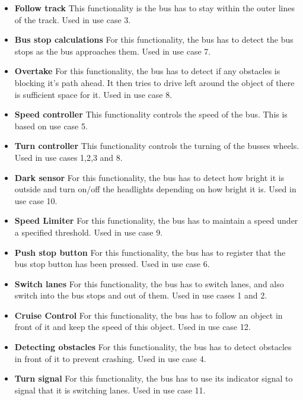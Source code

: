 \begin{itemize}
\item \textbf{Follow track}
This functionality is the bus has to stay within the outer lines of the track. Used in use case 3.
\item \textbf{Bus stop calculations}
For this functionality, the bus has to detect the bus stops as the bus approaches them. Used in use case 7.
\item \textbf{Overtake}
For this functionality, the bus has to detect if any obstacles is blocking it's path ahead. It then tries to drive left around the object of there is sufficient space for it. Used in use case 8.
\item \textbf{Speed controller}
This functionality controls the speed of the bus. This is based on use case 5.
\item \textbf{Turn controller}
This functionality controls the turning of the busses wheels. Used in use cases 1,2,3 and 8.
\item \textbf{Dark sensor}
For this functionality, the bus has to detect how bright it is outside and turn on/off the headlights depending on how bright it is. Used in use case 10.
\item \textbf{Speed Limiter}
For this functionality, the bus has to maintain a speed under a specified threshold. Used in use case 9.
\item \textbf{Push stop button}
For this functionality, the bus has to register that the bus stop button has been pressed. Used in use case 6.
\item \textbf{Switch lanes}
For this functionality, the bus has to switch lanes, and also switch into the bus stops and out of them. Used in use cases 1 and 2.
\item \textbf{Cruise Control}
For this functionality, the bus has to follow an object in front of it and keep the speed of this object. Used in use case 12.
\item \textbf{Detecting obstacles}
For this functionality, the bus has to detect obstacles in front of it to prevent crashing. Used in use case 4.
\item \textbf{Turn signal}
For this functionality, the bus has to use its indicator signal to signal that it is switching lanes. Used in use case  11.
\end{itemize}

